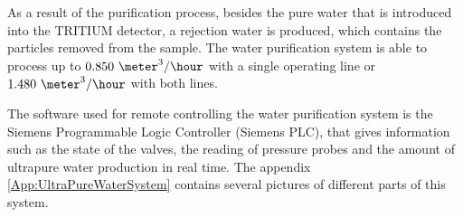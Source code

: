 As a result of the purification process, besides the pure water that is introduced into the TRITIUM detector, a rejection water is produced,  which contains the particles removed from the sample. The water purification system is able to process up to $0.850~\meter^3/\hour$ with a single operating line or $1.480~\meter^3/\hour$ with both lines.

The software used for remote controlling the water purification system is the Siemens Programmable Logic Controller (Siemens PLC), that gives information such as the state of the valves, the reading of pressure probes and the amount of ultrapure water production in real time. The appendix \ref{App:UltraPureWaterSystem} contains several pictures of different parts of this system.
